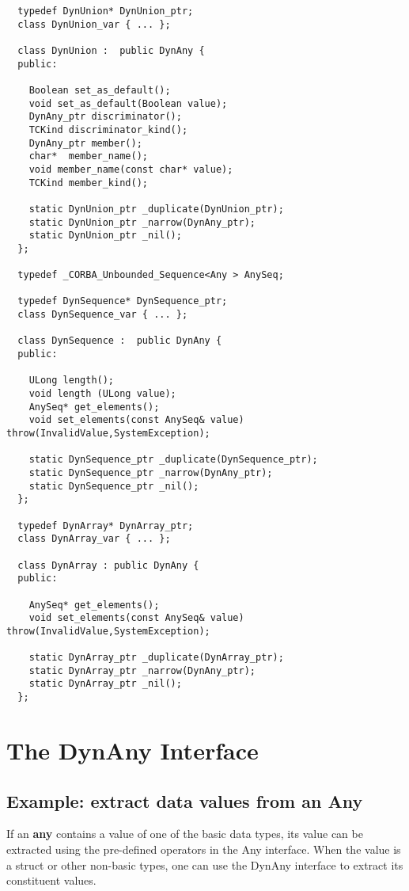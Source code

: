 \documentclass[11pt,twoside,onecolumn]{book}
\begin{document}
{\begin{verbatim}
  typedef DynUnion* DynUnion_ptr;
  class DynUnion_var { ... };

  class DynUnion :  public DynAny {
  public:

    Boolean set_as_default();
    void set_as_default(Boolean value);
    DynAny_ptr discriminator();
    TCKind discriminator_kind();
    DynAny_ptr member();
    char*  member_name();
    void member_name(const char* value);
    TCKind member_kind();

    static DynUnion_ptr _duplicate(DynUnion_ptr);
    static DynUnion_ptr _narrow(DynAny_ptr);
    static DynUnion_ptr _nil();
  };

  typedef _CORBA_Unbounded_Sequence<Any > AnySeq;

  typedef DynSequence* DynSequence_ptr;
  class DynSequence_var { ... };

  class DynSequence :  public DynAny {
  public:

    ULong length();
    void length (ULong value);
    AnySeq* get_elements();
    void set_elements(const AnySeq& value) throw(InvalidValue,SystemException);

    static DynSequence_ptr _duplicate(DynSequence_ptr);
    static DynSequence_ptr _narrow(DynAny_ptr);
    static DynSequence_ptr _nil();
  };

  typedef DynArray* DynArray_ptr;
  class DynArray_var { ... };

  class DynArray : public DynAny {
  public:

    AnySeq* get_elements();
    void set_elements(const AnySeq& value) throw(InvalidValue,SystemException);

    static DynArray_ptr _duplicate(DynArray_ptr);
    static DynArray_ptr _narrow(DynAny_ptr);
    static DynArray_ptr _nil();
  };

\end{verbatim}
}

\section{The DynAny Interface}
\label{dynany}

\subsection{Example: extract data values from an Any}

If an {\bf any} contains a value of one of the basic data types, its value
can be extracted using the pre-defined operators in the Any interface. When
the value is a struct or other non-basic types, one can use the DynAny
interface to extract its constituent values. 
\end{document}
